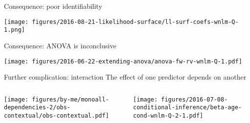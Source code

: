\documentclass{beamer}
\newcommand{\platefigscale}[0]{0.7}
\newcommand{\ownfigscale}[0]{0.4}
\begin{document}
\begin{frame}[label=identifiability]{Consequence: poor identifiability}
\begin{center}
\texttt{[image: figures/2016-08-21-likelihood-surface/ll-surf-coefs-wnlm-Q-1.png]}
\end{center}
\end{frame}

\begin{frame}[label=anova]{Consequence: ANOVA is inconclusive}
\begin{center}
\texttt{[image: figures/2016-06-22-extending-anova/anova-fw-rv-wnlm-Q-1.pdf]}
\end{center}
\end{frame}

\begin{frame}[label=interaction]{Further complication: interaction}
{The effect of one predictor depends on another}
\begin{columns}[t]
\begin{column}{0.4\textwidth}

\texttt{[image: figures/by-me/monoall-dependencies-2/obs-contextual/obs-contextual.pdf]}
\end{column}

\begin{column}{0.6\textwidth}

\texttt{[image: figures/2016-07-08-conditional-inference/beta-age-cond-wnlm-Q-2-1.pdf]}
\end{column}
\end{columns}
\end{frame}
\end{document}
